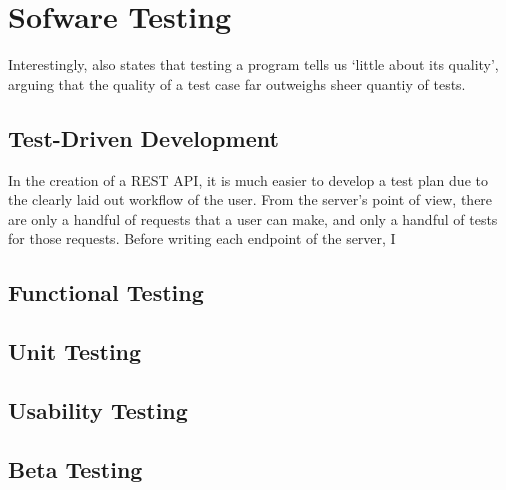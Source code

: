 \chapter{Sofware Testing}

\cite{4597151} 

Interestingly, \cite{4597151} also states that testing a program tells us `little about its quality', arguing that the quality of a test case far outweighs sheer quantiy of tests.

\section{Test-Driven Development}
In the creation of a REST API, it is much easier to develop a test plan due to the clearly laid out workflow of the user. From the server's point of view, there are only a handful of requests that a user can make, and only a handful of tests for those requests. Before writing each endpoint of the server, I 

\section{Functional Testing}

\section{Unit Testing}

\section{Usability Testing}

\section{Beta Testing}